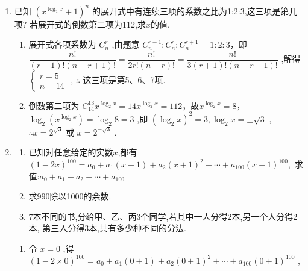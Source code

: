\begin{enumerate}
\begin{jieda}
\begin{enumerate}
        $\dfrac{{t}_{r + 2}}{{t}_{r + 1}} = \dfrac{C_5^{r+1}3^{r+1}}{{C}_{5}^{r}{3}^{r}} = 3 \times \dfrac{5-r}{r+1}$，令$3 \times \dfrac{5-r}{r+1} = 1$，即$15-3r = r+1$，$r = 3.5$，因此$t_5$最大，故展开式系数最大项为： ${T}_{5} = {405}x^\frac{26}{3}$
    \end{enumerate}
\end{jieda}

\item 已知 $(x^{\log_{2}x}+1)^{n}$ 的展开式中有连续三项的系数之比为1:2:3,这三项是第几项? 若展开式的倒数第二项为112,求$x$的值. 
\begin{jieda}
    \begin{enumerate}
        \item 展开式各项系数为 ${C}_{n}^{r}$ ,由题意 ${C}_{n}^{r - 1} : {C}_{n}^{r} : {C}_{n}^{r + 1} = 1 : 2 : 3$，即 $\dfrac{n!}{\left( {r - 1}\right) !\left( {n - r + 1}\right) !} = \dfrac{n!}{{2r}!\left( {n - r}\right) !} = \dfrac{n!}{3\left( {r + 1}\right) !\left( {n - r - 1}\right) !}$ ,解得 $\left\{  \begin{array}{l} r = 5 \\  n = {14} \end{array}\right.$ ,
        $\therefore$ 这三项是第5、6、7项.
        \item 倒数第二项为 ${C}_{14}^{13}{x}^{{\log }_{2}x} = {14}{x}^{{\log }_{2}x} = {112}$，故${x}^{{\log }_{2}x} = 8$，${\log }_{2}\left( {x}^{{\log }_{2}x}\right)  = {\log }_{2}8 = 3$ ,即 ${\left( {\log }_{2}x\right) }^{2} = 3,{\log }_{2}x =  \pm  \sqrt{3}$ ,
        $\therefore x = 2^{\sqrt{3}}$ 或 $x = {2}^{-\sqrt{3}}$ .
    \end{enumerate}
\end{jieda}

\item 
\begin{enumerate}
    \item 已知对任意给定的实数$x$,都有 $(1-2x)^{100}=a_{0}+a_{1}(x+1)+a_{2}(x+1)^{2}+\cdots+a_{100}(x+1)^{100},$ 求值:$a_{0}+a_{1}+a_{2}+\cdots+a_{100}$ 
    \item 求990除以1000的余数. 
    \item 7本不同的书,分给甲、乙、丙3个同学,若其中一人分得2本,另一个人分得2本, 第三人分得3本,共有多少种不同的分法. 
\end{enumerate}
\begin{jieda}
    \begin{enumerate}
        \item 令 $x = 0$ ,得 ${\left( 1 - 2 \times  0\right) }^{100} = {a}_{0} + {a}_{1}\left( {0 + 1}\right)  + {a}_{2}{\left( 0 + 1\right) }^{2} + \cdots  + {a}_{100}{\left( 0 + 1\right) }^{100}$ ,
        

\end{enumerate}
\end{jieda}
\end{enumerate}
